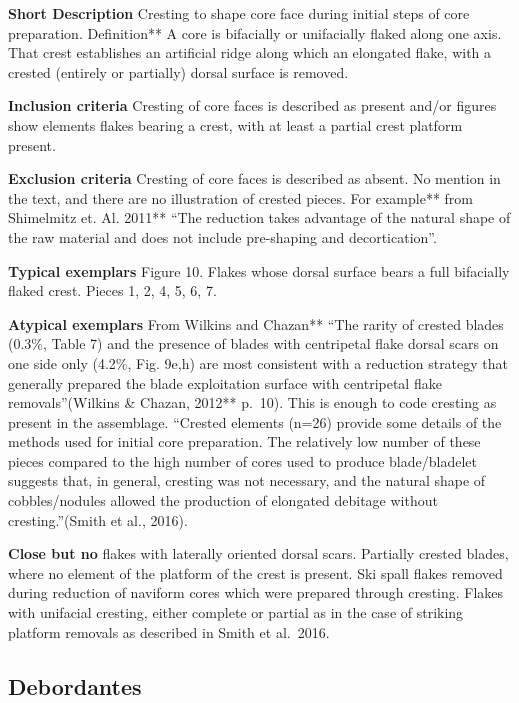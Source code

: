 \documentclass[
]{article}
\begin{document}
\textbf{Short Description} Cresting to shape core face during initial
steps of core preparation. Definition** A core is bifacially or
unifacially flaked along one axis. That crest establishes an artificial
ridge along which an elongated flake, with a crested (entirely or
partially) dorsal surface is removed.

\textbf{Inclusion criteria} Cresting of core faces is described as
present and/or figures show elements flakes bearing a crest, with at
least a partial crest platform present.

\textbf{Exclusion criteria} Cresting of core faces is described as
absent. No mention in the text, and there are no illustration of crested
pieces. For example** from Shimelmitz et. Al. 2011** ``The reduction
takes advantage of the natural shape of the raw material and does not
include pre-shaping and decortication''.

\textbf{Typical exemplars} Figure 10. Flakes whose dorsal surface bears
a full bifacially flaked crest. Pieces 1, 2, 4, 5, 6, 7.

\textbf{Atypical exemplars} From Wilkins and Chazan** ``The rarity of
crested blades (0.3\%, Table 7) and the presence of blades with
centripetal flake dorsal scars on one side only (4.2\%, Fig. 9e,h) are
most consistent with a reduction strategy that generally prepared the
blade exploitation surface with centripetal flake removals''(Wilkins \&
Chazan, 2012** p.~10). This is enough to code cresting as present in the
assemblage. ``Crested elements (n=26) provide some details of the
methods used for initial core preparation. The relatively low number of
these pieces compared to the high number of cores used to produce
blade/bladelet suggests that, in general, cresting was not necessary,
and the natural shape of cobbles/nodules allowed the production of
elongated debitage without cresting.''(Smith et al., 2016).

\textbf{Close but no} flakes with laterally oriented dorsal scars.
Partially crested blades, where no element of the platform of the crest
is present. Ski spall flakes removed during reduction of naviform cores
which were prepared through cresting. Flakes with unifacial cresting,
either complete or partial as in the case of striking platform removals
as described in Smith et al.~2016.

\hypertarget{debordantes}{%
\subsection{Debordantes}\label{debordantes}}
\end{document}
